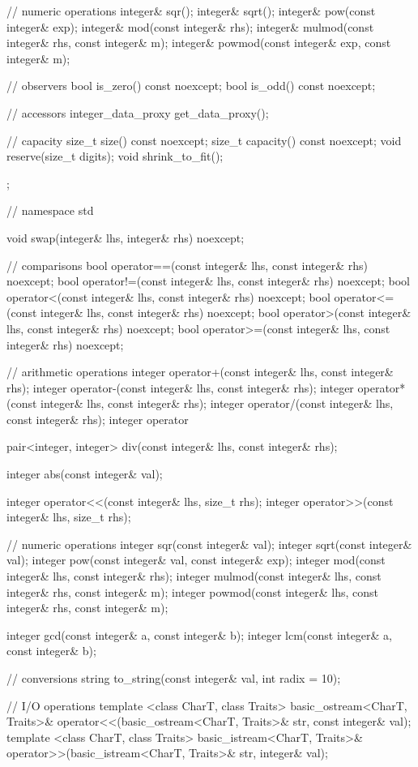 \begin{codeblock}
{{    // numeric operations
    integer& sqr();
    integer& sqrt();
    integer& pow(const integer& exp);
    integer& mod(const integer& rhs);
    integer& mulmod(const integer& rhs, const integer& m);
    integer& powmod(const integer& exp, const integer& m);
    
    // observers
    bool is_zero() const noexcept;
    bool is_odd() const noexcept;
    
    // accessors
    integer_data_proxy get_data_proxy();
    
    // capacity
    size_t size() const noexcept;
    size_t capacity() const noexcept;
    void reserve(size_t digits);
    void shrink_to_fit();
  };
} // namespace std

void swap(integer& lhs, integer& rhs) noexcept;

// comparisons
bool operator==(const integer& lhs, const integer& rhs) noexcept;
bool operator!=(const integer& lhs, const integer& rhs) noexcept;
bool operator<(const integer& lhs, const integer& rhs) noexcept;
bool operator<=(const integer& lhs, const integer& rhs) noexcept;
bool operator>(const integer& lhs, const integer& rhs) noexcept;
bool operator>=(const integer& lhs, const integer& rhs) noexcept;

// arithmetic operations
integer operator+(const integer& lhs, const integer& rhs);
integer operator-(const integer& lhs, const integer& rhs);
integer operator*(const integer& lhs, const integer& rhs);
integer operator/(const integer& lhs, const integer& rhs);
integer operator%

pair<integer, integer> div(const integer& lhs, const integer& rhs);

integer abs(const integer& val);

integer operator<<(const integer& lhs, size_t rhs);
integer operator>>(const integer& lhs, size_t rhs);

// numeric operations
integer sqr(const integer& val);
integer sqrt(const integer& val);
integer pow(const integer& val, const integer& exp);
integer mod(const integer& lhs, const integer& rhs);
integer mulmod(const integer& lhs, const integer& rhs, const integer& m);
integer powmod(const integer& lhs, const integer& rhs, const integer& m);

integer gcd(const integer& a, const integer& b);
integer lcm(const integer& a, const integer& b);

// conversions
string to_string(const integer& val, int radix = 10);

// I/O operations
template <class CharT, class Traits>
  basic_ostream<CharT, Traits>& operator<<(basic_ostream<CharT, Traits>& str,
                                           const integer& val);
template <class CharT, class Traits>
  basic_istream<CharT, Traits>& operator>>(basic_istream<CharT, Traits>& str,
                                           integer& val);
\end{codeblock}

